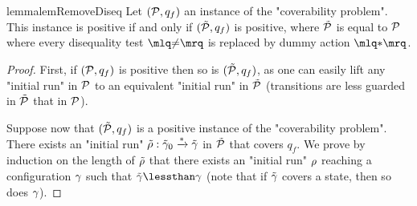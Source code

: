 \begin{restatable}{lemma}{lemRemoveDiseq}
	\label{lem:removing_diseq_tests}
	Let $(\mathcal{P}, q_f)$ an instance of the "coverability problem". This instance is positive if and only if $(\tilde{\mathcal{P}}, q_f)$ is positive, where $\tilde{\mathcal{P}}$ is equal to $\mathcal{P}$ where every disequality test $\quotemarks{\diseqtestact}$ is replaced by dummy action $\quotemarks{\dummyact}$.  
\end{restatable}

\begin{proof}
	First, if $(\mathcal{P}, q_f)$ is positive then so is $(\tilde{\mathcal{P}}, q_f)$, as one can easily lift any "initial run" in $\mathcal{P}$ to an equivalent "initial run" in $\tilde{\mathcal{P}}$ (transitions are less guarded  in $\tilde{\mathcal{P}}$ that in $\mathcal{P}$). 
	
	Suppose now that $(\tilde{\mathcal{P}}, q_f)$ is a positive instance of the "coverability problem". There exists an "initial run" $\tilde{\rho}: \tilde{\gamma}_0 \xrightarrow{*} \tilde{\gamma}$ in $\tilde{\mathcal{P}}$ that covers $q_f$. We prove by induction on the length of $\tilde{\rho}$ that there exists an "initial run" $\rho$ reaching a configuration $\gamma$ such that $\tilde{\config} \lessthan \config$ (note that if $\tilde{\gamma}$ covers a state, then so does $\gamma$). 
	

\end{proof}
